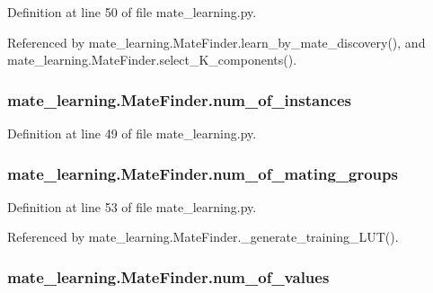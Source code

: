 Definition at line 50 of file mate\+\_\+learning.\+py.



Referenced by mate\+\_\+learning.\+Mate\+Finder.\+learn\+\_\+by\+\_\+mate\+\_\+discovery(), and mate\+\_\+learning.\+Mate\+Finder.\+select\+\_\+\+K\+\_\+components().

\hypertarget{classmate__learning_1_1_mate_finder_aeb435fdde37e9ac0cf72d03c25369201}{
\subsubsection[{num\+\_\+of\+\_\+instances}]{\setlength{\rightskip}{0pt plus 5cm}mate\+\_\+learning.\+Mate\+Finder.\+num\+\_\+of\+\_\+instances}}\label{classmate__learning_1_1_mate_finder_aeb435fdde37e9ac0cf72d03c25369201}


Definition at line 49 of file mate\+\_\+learning.\+py.

\hypertarget{classmate__learning_1_1_mate_finder_a56553c3120e135bb4a969fd445f6bf6b}{
\subsubsection[{num\+\_\+of\+\_\+mating\+\_\+groups}]{\setlength{\rightskip}{0pt plus 5cm}mate\+\_\+learning.\+Mate\+Finder.\+num\+\_\+of\+\_\+mating\+\_\+groups}}\label{classmate__learning_1_1_mate_finder_a56553c3120e135bb4a969fd445f6bf6b}


Definition at line 53 of file mate\+\_\+learning.\+py.



Referenced by mate\+\_\+learning.\+Mate\+Finder.\+\_\+generate\+\_\+training\+\_\+\+L\+U\+T().

\hypertarget{classmate__learning_1_1_mate_finder_ad876941a4f4bf2e1dda05bf4881861e4}{
\subsubsection[{num\+\_\+of\+\_\+values}]{\setlength{\rightskip}{0pt plus 5cm}mate\+\_\+learning.\+Mate\+Finder.\+num\+\_\+of\+\_\+values}}\label{classmate__learning_1_1_mate_finder_ad876941a4f4bf2e1dda05bf4881861e4}


